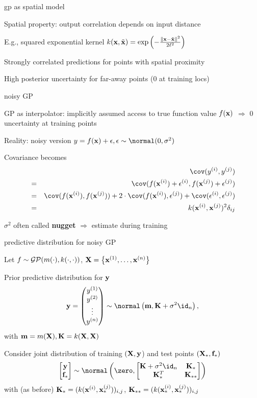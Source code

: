 \documentclass[11pt,compress,t,notes=noshow, xcolor=table]{beamer}
\begin{document}
\begin{framei}[sep=L]{gp as spatial model}
\item Spatial property: output correlation depends on input distance
\item E.g., squared exponential kernel $k(\xv, \tilde{\xv}) = \exp \left(-\frac{\| \xv - \tilde{\xv} \|^2}{2\ls^2} \right)$
\item Strongly correlated predictions for points with spatial proximity
\item High posterior uncertainty for far-away points (0 at training locs)
\vfill
{}
\end{framei}

\begin{framei}[sep=L]{noisy GP}
\item GP as interpolator: implicitly assumed access to true function value $\fx$ $\Rightarrow$ 0 uncertainty at training points
\item Reality: noisy version
$y = \fx + \eps, \eps \sim\normal(0, \sigma^2)$
\item Covariance becomes 
\begin{eqnarray*} 
&&\cov(y^{(i)}, y^{(j)}) \\ &=&  \cov (f(\xi) + \epsilon^{(i)}, f(\xi[j]) + \epsilon^{(j)}) \\
&=& \cov(f(\xi), f(\xi[j])) + 2 \cdot \cov(f(\xi), \epsilon^{(j)}) + \cov(\epsilon^{(i)}, \epsilon^{(j)}) 
\\ &=& \kxij + \sigma^2 \delta_{ij}
\end{eqnarray*}
\item $\sigma^2$ often called \textbf{nugget} $\Rightarrow$ estimate during training
\end{framei}

\begin{framei}[sep=L]{predictive distribution for noisy GP}
\item Let $f \sim \gpmk$, $\Xmat = \xdat$
\item Prior predictive distribution for $\yv$
$$
\yv = \begin{pmatrix} \yi[1] \\ \yi[2] \\ \vdots \\ \yi[n] \end{pmatrix} \sim \normal\left(\mv, \Kmat + \sigma^2 \id_n \right),
$$
with $\mv = m(\Xmat), \Kmat = k(\Xmat, \Xmat)$
\item Consider joint distribution of training $(\Xmat, \yv$) and test points $(\Xmat_*, \fv_*)$
$$
\begin{bmatrix} \yv \\ \fv_* \end{bmatrix} \sim  
\normal\left(\zero, \begin{bmatrix} \Kmat + \sigma^2 \id_n & \Kstar \\ \Kstar^T & \Kstarstar \end{bmatrix}\right)
$$
with (as before) $\Kstar = (k(\xi, \xstar^{(j)}))_{i,j}$, $\Kstarstar = (k(\xi[i]_*, \xi[j]_*))_{i,j}$
\end{framei}
\end{document}
